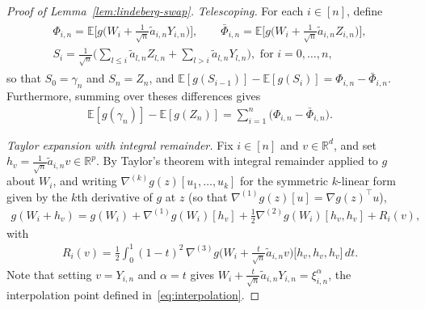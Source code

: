 \documentclass[12pt]{article}
\newcommand{\real}{\mathbb{R}}
\newcommand{\Ee}{{\mathbb{E}}}
\begin{document}
\begin{appendices}
\begin{proof}[Proof of Lemma~\ref{lem:lindeberg-swap}]
\textit{Telescoping.}
For each $i\in[n]$, define
\begin{align*}
\begin{gathered}
  \Phi_{i,n}
  =\Ee\Big[g\Big(W_i+\tfrac{1}{\sqrt n}\widetilde a_{i,n}Y_{i,n}\Big)\Big],
  \qquad
  \bar\Phi_{i,n}
  =\Ee\Big[g\Big(W_i+\tfrac{1}{\sqrt n}\widetilde a_{i,n}Z_{i,n}\Big)\Big],\\
  S_i=\frac{1}{\sqrt n}\big(\sum_{l\le i}\widetilde a_{l,n}Z_{l,n}
+\sum_{l>i}\widetilde a_{l,n}Y_{l,n}\big), \text{ for  } i=0,\dots,n,
\end{gathered}
\end{align*}
so that
$S_0=\gamma_n$ and $S_n=Z_n$, and 
$\Ee[g(S_{i-1})]-\Ee[g(S_i)]=\Phi_{i,n}-\bar\Phi_{i,n}$.
Furthermore, summing over theses differences gives
\begin{align}
  \label{eq:telescope}
  \Ee[g(\gamma_n)]-\Ee[g(Z_n)]
  =\sum_{i=1}^n\big(\Phi_{i,n}-\bar\Phi_{i,n}\big).
\end{align}

\medskip\noindent\textit{Taylor expansion with integral remainder.}
Fix $i\in[n]$ and $v\in\real^d$, and set $h_v=\tfrac{1}{\sqrt n}\widetilde a_{i,n}v\in\real^p$. 
By Taylor's theorem with integral remainder applied to $g$ about $W_i$, and writing $\nabla^{(k)}g(z)[u_1,\dots,u_k]$ for the symmetric $k$-linear form given by the $k$th derivative of $g$ at $z$ (so that $\nabla^{(1)}g(z)[u]=\nabla g(z)^\top u$),
\begin{align}
  \label{eq:taylor}
  g(W_i+h_v)
  =g(W_i)+\nabla^{(1)}g(W_i)[h_v]
   +\tfrac12\nabla^{(2)}g(W_i)[h_v,h_v]+R_i(v),
\end{align}
with
\begin{align}
  \label{eq:remainder}
  R_i(v)
  =\frac12\int_0^1(1-t)^2\,
   \nabla^{(3)}g\Big(W_i+\tfrac{t}{\sqrt n}\widetilde a_{i,n}v\Big)
   \big[h_v,h_v,h_v\big]\,dt.
\end{align}
Note that setting $v=Y_{i,n}$ and $\alpha=t$ gives
$W_i+\tfrac{t}{\sqrt n}\widetilde a_{i,n}Y_{i,n}=\xi^{\alpha}_{i,n}$,
the interpolation point defined in~\eqref{eq:interpolation}.


\end{proof}
\end{appendices}
\end{document}
